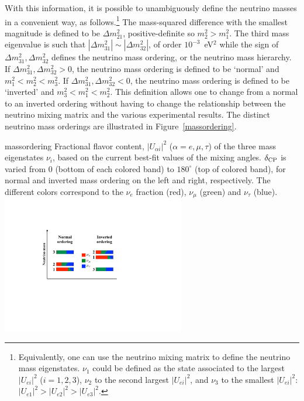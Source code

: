 With this information, it is possible to unambiguously define the neutrino masses in a convenient way, as follows.\footnote{Equivalently, one can use the neutrino mixing matrix to define the neutrino mass eigenstates. $\nu_1$ could be defined as the state associated to the largest $|U_{ei}|^2$ ($i=1,2,3$), $\nu_2$ to the second largest $|U_{ei}|^2$, and $\nu_3$ to the smallest $|U_{ei}|^2$: $|U_{e1}|^2>|U_{e2}|^2>|U_{e3}|^2$.} The mass-squared difference with the smallest magnitude is defined to be $\Delta m^2_{21}$, positive-definite so $m_2^2>m_1^2$. The third mass eigenvalue is such that $|\Delta m^2_{31}|\sim|\Delta m^2_{32}|$, of order $10^{-3}$~eV$^2$ while the sign of  $\Delta m^2_{31}, \Delta m^2_{32}$ defines the neutrino mass ordering, or the neutrino mass hierarchy. If $\Delta m^2_{31}, \Delta m^2_{32}>0$, the neutrino mass ordering is defined to be `normal' and $m_1^2<m_2^2<m_3^2$. If $\Delta m^2_{31}, \Delta m^2_{32}<0$, the neutrino mass ordering is defined to be `inverted' and $m_3^2<m_1^2<m_2^2$. This definition allows one to change from a normal to an inverted ordering without having to change the relationship between the neutrino mixing matrix and the various experimental results. The distinct neutrino mass orderings are illustrated in Figure~\ref{massordering}.
\begin{dunefigure}{massordering}{
   Fractional flavor content, $|U_{\alpha i}|^2$ ($\alpha = e, \mu, \tau$) of the three mass eigenstates $\nu_i$, based on the current best-fit values of the mixing angles. $\delta_{\rm CP}$ is varied from 0 (bottom of each colored band) to $180^\circ$ (top of colored band), for normal and inverted mass ordering on the left and right, respectively. The different colors correspond to the $\nu_e$ fraction (red), $\nu_\mu$ (green) and $\nu_\tau$ (blue). 
}
  \includegraphics[width=0.6\textwidth]{graphics/PastedGraphic-1.pdf}
\end{dunefigure}

